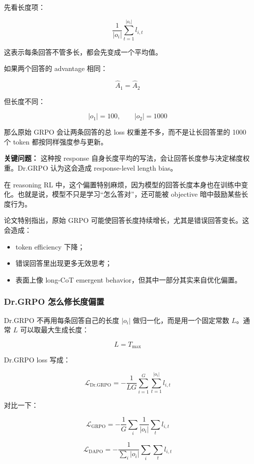 先看长度项：

\[
\frac{1}{|o_i|}
\sum_{t=1}^{|o_i|}
l_{i,t}
\]

这表示每条回答不管多长，都会先变成一个平均值。

如果两个回答的 advantage 相同：

\[
\hat{A}_1 = \hat{A}_2
\]

但长度不同：

\[
|o_1| = 100,
\qquad
|o_2| = 1000
\]

那么原始 GRPO 会让两条回答的总 loss 权重差不多，而不是让长回答里的 1000 个 token 都按同样强度参与更新。

\begin{warnbox}
\textbf{关键问题：} 这种按 response 自身长度平均的写法，会让回答长度参与决定梯度权重。Dr.GRPO 认为这会造成 response-level length bias。
\end{warnbox}

在 reasoning RL 中，这个偏置特别麻烦，因为模型的回答长度本身也在训练中变化。也就是说，模型不只是学习“怎么答对”，还可能被 objective 暗中鼓励某些长度行为。

论文特别指出，原始 GRPO 可能使回答长度持续增长，尤其是错误回答变长。这会造成：

\begin{itemize}[leftmargin=1.5em]
  \item token efficiency 下降；
  \item 错误回答里出现更多无效思考；
  \item 表面上像 long-CoT emergent behavior，但其中一部分其实来自优化偏置。
\end{itemize}

\subsubsection{Dr.GRPO 怎么修长度偏置}

Dr.GRPO 不再用每条回答自己的长度 $|o_i|$ 做归一化，而是用一个固定常数 $L$。通常 $L$ 可以取最大生成长度：

\[
L = T_\text{max}
\]

Dr.GRPO loss 写成：

\[
\mathcal{L}_\text{Dr.GRPO}
=
-
\frac{1}{LG}
\sum_{i=1}^{G}
\sum_{t=1}^{|o_i|}
l_{i,t}
\]

对比一下：

\[
\mathcal{L}_\text{GRPO}
=
-
\frac{1}{G}
\sum_i
\frac{1}{|o_i|}
\sum_t l_{i,t}
\]

\[
\mathcal{L}_\text{DAPO}
=
-
\frac{1}{\sum_i |o_i|}
\sum_i
\sum_t l_{i,t}
\]

